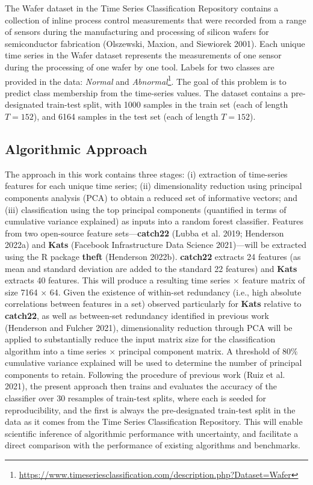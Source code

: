 \documentclass{article}
\begin{document}
The Wafer dataset in the Time Series Classification Repository contains a collection of inline process control measurements that were recorded from a range of sensors during the manufacturing and processing of silicon wafers for semiconductor fabrication (Olszewski, Maxion, and Siewiorek 2001). Each unique time series in the Wafer dataset represents the measurements of one sensor during the processing of one wafer by one tool. Labels for two classes are provided in the data: \emph{Normal} and \emph{Abnormal}\footnote{\url{https://www.timeseriesclassification.com/description.php?Dataset=Wafer}}. The goal of this problem is to predict class membership from the time-series values. The dataset contains a pre-designated train-test split, with 1000 samples in the train set (each of length \(T = 152\)), and 6164 samples in the test set (each of length \(T = 152\)).

\hypertarget{algorithmic-approach}{%
\subsection{Algorithmic Approach}\label{algorithmic-approach}}

The approach in this work contains three stages: (i) extraction of time-series features for each unique time series; (ii) dimensionality reduction using principal components analysis (PCA) to obtain a reduced set of informative vectors; and (iii) classification using the top principal components (quantified in terms of cumulative variance explained) as inputs into a random forest classifier. Features from two open-source feature sets---\textbf{catch22} (Lubba et al. 2019; Henderson 2022a) and \textbf{Kats} (Facebook Infrastructure Data Science 2021)---will be extracted using the R package \textbf{theft} (Henderson 2022b). \textbf{catch22} extracts 24 features (as mean and standard deviation are added to the standard 22 features) and \textbf{Kats} extracts 40 features. This will produce a resulting time series \(\times\) feature matrix of size 7164 \(\times\) 64. Given the existence of within-set redundancy (i.e., high absolute correlations between features in a set) observed particularly for \textbf{Kats} relative to \textbf{catch22}, as well as between-set redundancy identified in previous work (Henderson and Fulcher 2021), dimensionality reduction through PCA will be applied to substantially reduce the input matrix size for the classification algorithm into a time series \(\times\) principal component matrix. A threshold of 80\(\%\) cumulative variance explained will be used to determine the number of principal components to retain. Following the procedure of previous work (Ruiz et al. 2021), the present approach then trains and evaluates the accuracy of the classifier over 30 resamples of train-test splits, where each is seeded for reproducibility, and the first is always the pre-designated train-test split in the data as it comes from the Time Series Classification Repository. This will enable scientific inference of algorithmic performance with uncertainty, and facilitate a direct comparison with the performance of existing algorithms and benchmarks.
\end{document}
